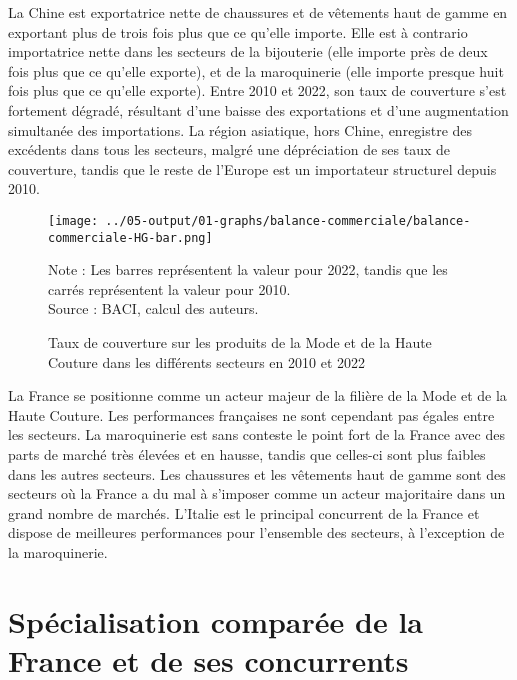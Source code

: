 \documentclass[french,10pt,a4paper]{article}
\begin{document}
La Chine est exportatrice nette de chaussures et de vêtements haut de gamme en exportant plus de trois fois plus que ce qu'elle importe. Elle est à contrario importatrice nette dans les secteurs de la bijouterie (elle importe près de deux fois plus que ce qu'elle exporte), et de la maroquinerie (elle importe presque huit fois plus que ce qu'elle exporte). Entre 2010 et 2022, son taux de couverture s'est fortement dégradé, résultant d'une baisse des exportations et d'une augmentation simultanée des importations. La région asiatique, hors Chine, enregistre des excédents dans tous les secteurs, malgré une dépréciation de ses taux de couverture, tandis que le reste de l'Europe est un importateur structurel depuis 2010.

\begin{figure}[!h]
  \centering
  \texttt{[image: ../05-output/01-graphs/balance-commerciale/balance-commerciale-HG-bar.png]}
  \captionsetup{justification=justified, singlelinecheck=false, font=small}
  \caption*{Note : Les barres représentent la valeur pour 2022, tandis que les carrés représentent la valeur pour 2010. \\
  Source : BACI, calcul des auteurs.}
  \captionsetup{justification=centering, singlelinecheck=true, font=normalsize}
  \caption{Taux de couverture sur les produits de la Mode et de la Haute Couture dans les différents secteurs en 2010 et 2022}
  \label{fig:balance-commerciale}
\end{figure}

\bigskip

La France se positionne comme un acteur majeur de la filière de la Mode et de la Haute Couture. Les performances françaises ne sont cependant pas égales entre les secteurs. La maroquinerie est sans conteste le point fort de la France avec des parts de marché très élevées et en hausse, tandis que celles-ci sont plus faibles dans les autres secteurs. Les chaussures et les vêtements haut de gamme sont des secteurs où la France a du mal à s'imposer comme un acteur majoritaire dans un grand nombre de marchés. L'Italie est le principal concurrent de la France et dispose de meilleures performances pour l'ensemble des secteurs, à l'exception de la maroquinerie. 






\newpage
{}

\section{Spécialisation comparée de la France et de ses concurrents}
\end{document}
